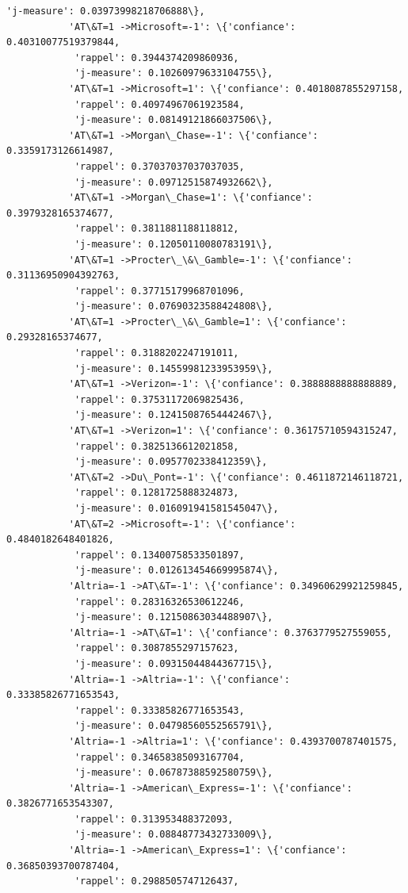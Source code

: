 \documentclass[11pt]{article}
\begin{document}
\begin{Verbatim}[commandchars=\\\{\}]
            'j-measure': 0.03973998218706888\},
           'AT\&T=1 ->Microsoft=-1': \{'confiance': 0.40310077519379844,
            'rappel': 0.3944374209860936,
            'j-measure': 0.10260979633104755\},
           'AT\&T=1 ->Microsoft=1': \{'confiance': 0.4018087855297158,
            'rappel': 0.40974967061923584,
            'j-measure': 0.08149121866037506\},
           'AT\&T=1 ->Morgan\_Chase=-1': \{'confiance': 0.3359173126614987,
            'rappel': 0.37037037037037035,
            'j-measure': 0.09712515874932662\},
           'AT\&T=1 ->Morgan\_Chase=1': \{'confiance': 0.3979328165374677,
            'rappel': 0.3811881188118812,
            'j-measure': 0.12050110080783191\},
           'AT\&T=1 ->Procter\_\&\_Gamble=-1': \{'confiance': 0.31136950904392763,
            'rappel': 0.37715179968701096,
            'j-measure': 0.07690323588424808\},
           'AT\&T=1 ->Procter\_\&\_Gamble=1': \{'confiance': 0.29328165374677,
            'rappel': 0.3188202247191011,
            'j-measure': 0.14559981233953959\},
           'AT\&T=1 ->Verizon=-1': \{'confiance': 0.3888888888888889,
            'rappel': 0.37531172069825436,
            'j-measure': 0.12415087654442467\},
           'AT\&T=1 ->Verizon=1': \{'confiance': 0.36175710594315247,
            'rappel': 0.3825136612021858,
            'j-measure': 0.0957702338412359\},
           'AT\&T=2 ->Du\_Pont=-1': \{'confiance': 0.4611872146118721,
            'rappel': 0.1281725888324873,
            'j-measure': 0.016091941581545047\},
           'AT\&T=2 ->Microsoft=-1': \{'confiance': 0.4840182648401826,
            'rappel': 0.13400758533501897,
            'j-measure': 0.012613454669995874\},
           'Altria=-1 ->AT\&T=-1': \{'confiance': 0.34960629921259845,
            'rappel': 0.28316326530612246,
            'j-measure': 0.12150863034488907\},
           'Altria=-1 ->AT\&T=1': \{'confiance': 0.3763779527559055,
            'rappel': 0.3087855297157623,
            'j-measure': 0.09315044844367715\},
           'Altria=-1 ->Altria=-1': \{'confiance': 0.33385826771653543,
            'rappel': 0.33385826771653543,
            'j-measure': 0.04798560552565791\},
           'Altria=-1 ->Altria=1': \{'confiance': 0.4393700787401575,
            'rappel': 0.34658385093167704,
            'j-measure': 0.06787388592580759\},
           'Altria=-1 ->American\_Express=-1': \{'confiance': 0.3826771653543307,
            'rappel': 0.313953488372093,
            'j-measure': 0.08848773432733009\},
           'Altria=-1 ->American\_Express=1': \{'confiance': 0.36850393700787404,
            'rappel': 0.2988505747126437,

\end{Verbatim}
\end{document}
